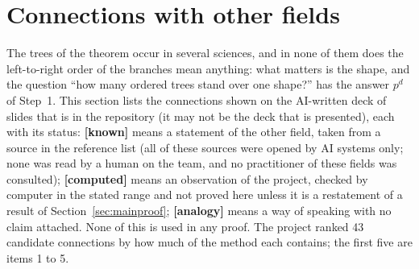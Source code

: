 \documentclass[11pt]{article}
\theoremstyle{definition}
\theoremstyle{remark}
\numberwithin{equation}{section}
\numberwithin{figure}{section}
\begin{document}
\section{Connections with other fields}\label{sec:connections}
The trees of the theorem occur in several sciences, and in none of them does the left-to-right order of the
branches mean anything: what matters is the shape, and the question ``how many ordered trees stand over one
shape?'' has the answer $p^d$ of Step~1. This section lists the connections shown on the AI-written deck of slides that is in the repository (it may
not be the deck that is presented), each
with its status: \textbf{[known]} means a statement of the other field, taken from a source in the reference
list (all of these sources were opened by AI systems only; none was read by a human on the team, and no
practitioner of these fields was consulted); \textbf{[computed]} means an observation of the project, checked
by computer in the stated range and not proved here unless it is a restatement of a result of
Section~\ref{sec:mainproof}; \textbf{[analogy]} means a way of speaking with no claim attached. None of this
is used in any proof. The project ranked 43 candidate connections by how much of the method each contains;
the first five are items 1 to 5.
\end{document}
